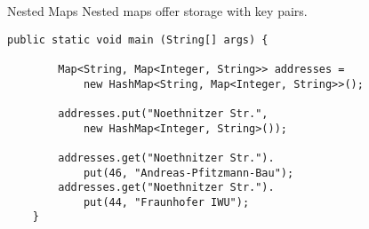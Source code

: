 \begin{frame}[fragile]{Nested Maps}
	Nested maps offer storage with key pairs.
	\begin{lstlisting}[basicstyle=\ttfamily\scriptsize]
	public static void main (String[] args) {		
	
	    Map<String, Map<Integer, String>> addresses = 
		    new HashMap<String, Map<Integer, String>>();
		
	    addresses.put("Noethnitzer Str.", 
	        new HashMap<Integer, String>());
		
	    addresses.get("Noethnitzer Str.").
	        put(46, "Andreas-Pfitzmann-Bau");
	    addresses.get("Noethnitzer Str.").
	        put(44, "Fraunhofer IWU");
	}
	\end{lstlisting}
\end{frame}

